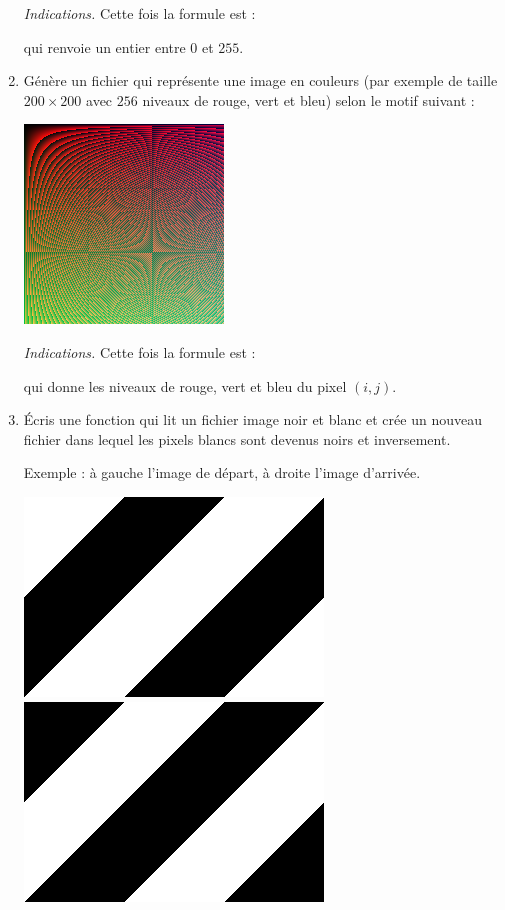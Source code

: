 \documentclass[11pt,class=report,crop=false]{standalone}
\begin{document}
\begin{activite}
\begin{enumerate}
\emph{Indications.} Cette fois la formule est :\\
\centerline{}
qui renvoie un entier entre $0$ et $255$.

   \item Génère un fichier  qui représente une image en couleurs (par exemple de taille $200 \times 200$ avec $256$ niveaux de rouge, vert et bleu) selon le motif suivant :
\begin{center}
\includegraphics[scale=0.7]{ecran-image_coul}
\end{center}   

\emph{Indications.} Cette fois la formule est :\\
\centerline{}
\centerline{}
\centerline{}
qui donne les niveaux de rouge, vert et bleu du pixel $(i,j)$.

\item Écris une fonction  qui lit un fichier image noir et blanc  et crée un nouveau fichier dans lequel les pixels blancs sont devenus noirs et inversement. 

Exemple : à gauche l'image de départ, à droite l'image d'arrivée.
\begin{center}
\includegraphics[scale=0.3]{ecran-simple_nb}\qquad\qquad
\includegraphics[scale=0.3]{ecran-simple_nb_inverse}
\end{center} 


\end{enumerate}
\end{activite}
\end{document}
